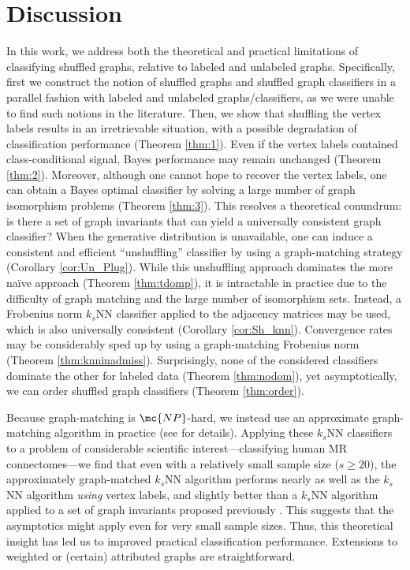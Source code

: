 \documentclass[10pt,journal,cspaper,compsoc]{IEEEtran}
\begin{document}
\section{Discussion}

In this work, we address both the theoretical and practical limitations of classifying shuffled graphs, relative to labeled and unlabeled graphs.  Specifically, first we construct the notion of shuffled graphs and shuffled graph classifiers in a parallel fashion with labeled and unlabeled graphs/classifiers, as we were unable to find such notions in the literature.  Then, we show that shuffling the vertex labels results in an irretrievable situation, with a possible degradation of classification performance (Theorem \ref{thm:1}). Even if the vertex labels contained class-conditional signal, Bayes performance may remain unchanged (Theorem \ref{thm:2}).  Moreover, although one cannot hope to recover the vertex labels, one can obtain a Bayes optimal classifier by solving a large number of graph isomorphism problems (Theorem \ref{thm:3}).  This resolves a theoretical conundrum: is there a set of graph invariants that can yield a universally consistent graph classifier?  When the generative distribution is unavailable, one can induce a consistent and efficient ``unshuffling'' classifier by using a graph-matching strategy (Corollary \ref{cor:Un_Plug}).  While this unshuffling approach dominates the more na\"ive approach (Theorem \ref{thm:tdomp}), it is intractable in practice due to the difficulty of graph matching and the large number of isomorphism sets.  Instead, a Frobenius norm $k_s$NN classifier applied to the adjacency matrices may be used, which is also universally consistent (Corollary \ref{cor:Sh_knn}).  Convergence rates may be considerably sped up by using a graph-matching Frobenius norm (Theorem \ref{thm:knninadmiss}).  Surprisingly, none of the considered classifiers dominate the other for labeled data (Theorem \ref{thm:nodom}), yet asymptotically, we can order shuffled graph classifiers (Theorem \ref{thm:order}).

Because graph-matching is $\mc{NP}$-hard, we instead use an approximate graph-matching algorithm in practice (see \cite{VP11_QAP} for details).  Applying these $k_s$NN classifiers to a problem of considerable scientific interest---classifying human MR connectomes---we find that even with a relatively small sample size ($s \geq 20$), the approximately graph-matched $k_s$NN algorithm performs nearly as well as the $k_s$NN algorithm \emph{using} vertex labels, and slightly better than a $k_s$NN algorithm applied to a set of graph invariants proposed previously \cite{PCP10}.  This suggests that the asymptotics might apply even for very small sample sizes.  Thus, this theoretical insight has led us to improved practical classification performance.  Extensions to weighted or (certain) attributed graphs are straightforward.
\end{document}
